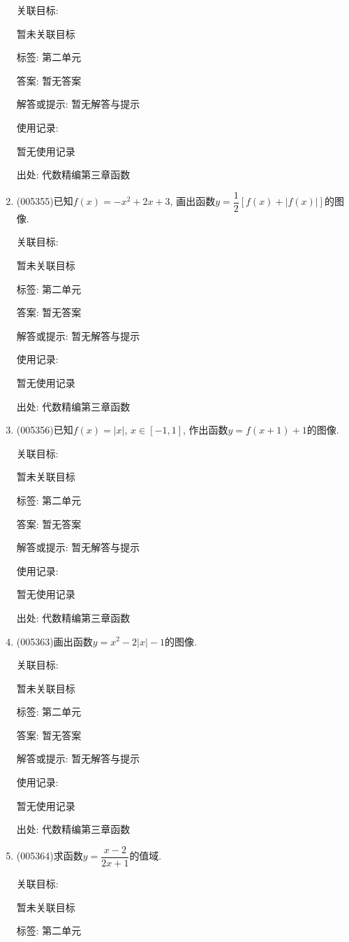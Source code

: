 \documentclass[10pt,a4paper]{article}
\begin{document}
\begin{enumerate}[1.]
关联目标:

暂未关联目标



标签: 第二单元

答案: 暂无答案

解答或提示: 暂无解答与提示

使用记录:

暂无使用记录


出处: 代数精编第三章函数
\item { (005355)}已知$f(x)=-x^2+2x+3$, 画出函数$y=\dfrac 12[f(x)+|f(x)|]$的图像.


关联目标:

暂未关联目标



标签: 第二单元

答案: 暂无答案

解答或提示: 暂无解答与提示

使用记录:

暂无使用记录


出处: 代数精编第三章函数
\item { (005356)}已知$f(x)=|x|$, $x\in [-1,1]$, 作出函数$y=f(x+1)+1$的图像.


关联目标:

暂未关联目标



标签: 第二单元

答案: 暂无答案

解答或提示: 暂无解答与提示

使用记录:

暂无使用记录


出处: 代数精编第三章函数
\item { (005363)}画出函数$y=x^2-2|x|-1$的图像.


关联目标:

暂未关联目标



标签: 第二单元

答案: 暂无答案

解答或提示: 暂无解答与提示

使用记录:

暂无使用记录


出处: 代数精编第三章函数
\item { (005364)}求函数$y=\dfrac{x-2}{2x+1}$的值域.


关联目标:

暂未关联目标



标签: 第二单元


\end{enumerate}
\end{document}
